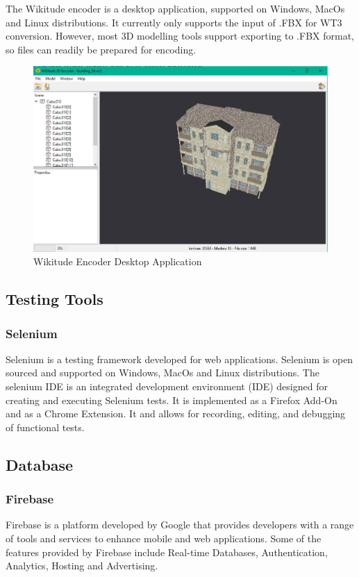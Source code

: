 The Wikitude encoder is a desktop application, supported on Windows, MacOs and Linux distributions. It currently only supports the input of .FBX for WT3 conversion. However, most 3D modelling tools support exporting to .FBX format, so files can readily be prepared for encoding. 
\begin{figure}[!ht]
\caption{Wikitude Encoder Desktop Application}
\centering
\includegraphics[width=1\textwidth]{images/wikitude_encoder.JPG}
\end{figure}


\subsection{Testing Tools}
\subsubsection{Selenium}
Selenium is a testing framework developed for web applications. Selenium is open sourced and supported on Windows, MacOs and Linux distributions. The selenium IDE is an integrated development environment (IDE) designed for creating and executing Selenium tests. It is implemented as a Firefox Add-On and as a Chrome Extension. It and allows for recording, editing, and debugging of functional tests\cite{selenium}.

\subsection{Database}

\subsubsection{Firebase}
Firebase is a platform developed by Google that provides developers with a range of tools and services to enhance mobile and web applications. Some of the features provided by Firebase include Real-time Databases, Authentication, Analytics, Hosting and Advertising\cite{firebase}. 
